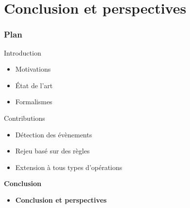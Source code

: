 \documentclass[aspectratio=1610]{beamer}
\begin{document}
\section[Conclusion]{Conclusion et perspectives}
\begin{frame}
	\frametitle{Plan}
	\centering
	\begin{minipage}{\textwidth}
		\raggedright
		\begin{minipage}{.55\textwidth}
			\begin{mytocblock}{Introduction}
				\begin{itemize}
					\item[] Motivations
					\item[] État de l'art
					\item[] Formalismes
				\end{itemize}
			\end{mytocblock}
		\end{minipage}

		\vspace{1em}

		\begin{minipage}{.55\textwidth}
			\begin{mytocblock}{Contributions}
				\begin{itemize}
					\item[] Détection des évènements
					\item[] Rejeu basé sur des règles
					\item[] Extension à tous types d'opérations
				\end{itemize}
			\end{mytocblock}
		\end{minipage}

		\vspace{1em}

		\begin{minipage}{.55\textwidth}
			\begin{mytocblock}{\textbf{Conclusion}}
				\begin{itemize}
					\item[] \textbf{Conclusion et perspectives}
				\end{itemize}
			\end{mytocblock}
		\end{minipage}
	\end{minipage}
\end{frame}

\end{document}
